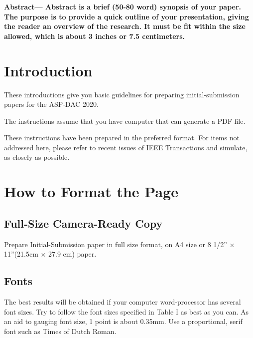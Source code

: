 {\small\bf Abstract---
 Abstract is a brief (50-80 word) synopsis of your paper.
The purpose is to provide a quick outline of your
presentation, giving the reader an overview of the
research. It must be fit within the size allowed, which is
about 3 inches or 7.5 centimeters.}

\section{Introduction}

These introductions give you basic guidelines for preparing
initial-submission papers for the ASP-DAC 2020.

The instructions assume that you have computer that can generate a PDF
file.

These instructions have been prepared in the preferred format. For items
not addressed here, please refer to recent issues of IEEE Transactions
and simulate, as closely as possible.


\section{How to Format the Page}

\subsection{Full-Size Camera-Ready Copy}

Prepare Initial-Submission paper in full size format, on A4 size or 8 1/2''
$\times$ 11''(21.5cm $\times$ 27.9 cm) paper.

\subsection{Fonts}
The best results will be obtained if your computer word-processor has
several font sizes. Try to follow the font sizes specified in Table I as
best as you can. As an aid to gauging font size, 1 point is about
0.35mm. Use a proportional, serif font such as Times of Dutch Roman.

